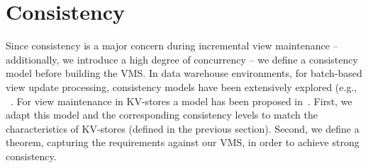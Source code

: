 %
%
\section{Consistency}
\label{sec:consistency}

Since consistency is a major concern during incremental view
maintenance -- additionally, we introduce a high degree of concurrency --
we define a consistency model before building the VMS. 
In data warehouse environments, for batch-based view update
processing, consistency models have been extensively explored (e.g.,
~\cite{zhuge:view, wang:efficient, zhang:parallel, zhuge:strobe}. For
view maintenance in KV-stores a model has been proposed
in~\cite{jacobsen:viewmaintenance}. First, we adapt this model and the
corresponding consistency levels to match the characteristics of 
KV-stores (defined in the previous section). Second, we define a theorem, 
capturing the requirements against our VMS, in order to achieve strong
consistency.

%
%





